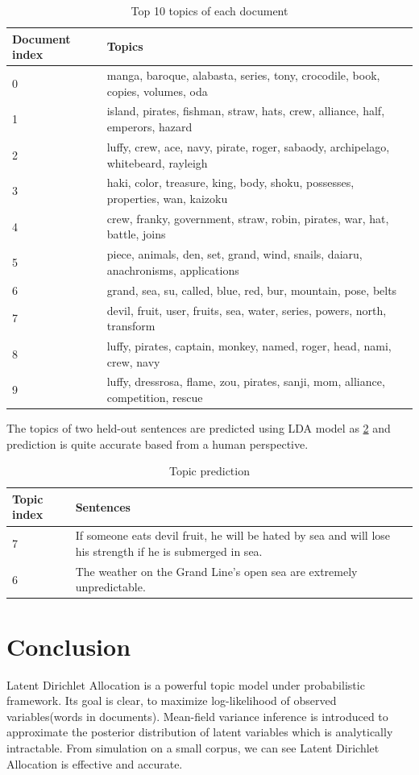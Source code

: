 \documentclass{article}
\begin{document}
\begin{table}[htbp]
	\caption{Top 10 topics of each document}
	\label{table_topics}
	\centering
	\begin{tabular}{ll}
		\toprule
		Document index	& Topics \\
		\midrule
		0 & manga, baroque, alabasta, series, tony, crocodile, book, copies, volumes, oda \\
		1  & island, pirates, fishman, straw, hats, crew, alliance, half, emperors, hazard \\
		2  & luffy, crew, ace, navy, pirate, roger, sabaody, archipelago, whitebeard, rayleigh \\
		3  & haki, color, treasure, king, body, shoku, possesses, properties, wan, kaizoku \\
		4  & crew, franky, government, straw, robin, pirates, war, hat, battle, joins \\
		5  & piece, animals, den, set, grand, wind, snails, daiaru, anachronisms, applications \\
		6  & grand, sea, su, called, blue, red, bur, mountain, pose, belts \\
		7  & devil, fruit, user, fruits, sea, water, series, powers, north, transform \\
		8  & luffy, pirates, captain, monkey, named, roger, head, nami, crew, navy \\
		9  & luffy, dressrosa, flame, zou, pirates, sanji, mom, alliance, competition, rescue \\
		\bottomrule
	\end{tabular}
\end{table}

The topics of two held-out sentences are predicted using LDA model as \ref{table_pred} and prediction is quite accurate based from a human perspective.

\begin{table}[htbp]
	\caption{Topic prediction}
	\label{table_pred}
	\centering
	\begin{tabular}{ll}
		\toprule
		Topic index	& Sentences \\
		\midrule
		7 & If someone eats devil fruit, he will be hated by sea and will lose his strength if he is submerged in sea. \\
		6 & The weather on the Grand Line's open sea are extremely unpredictable. \\
		\bottomrule
	\end{tabular}
\end{table}

\section{Conclusion}

Latent Dirichlet Allocation is a powerful topic model under probabilistic framework. Its goal is clear, to maximize log-likelihood of observed variables(words in documents). Mean-field variance inference is introduced to approximate the posterior distribution of latent variables which is analytically intractable. From simulation on a small corpus, we can see Latent Dirichlet Allocation is effective and accurate.
\end{document}
